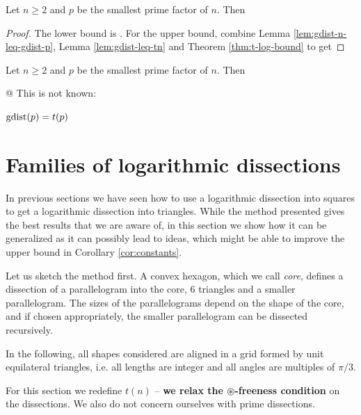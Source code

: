 
\begin{cor}
\label{cor:conj-proof}
Let $n \geq 2$ and $p$ be the smallest prime factor of $n$. Then
\end{cor}%
\begin{proof}
The lower bound is . For the upper bound, combine Lemma \ref{lem:gdist-n-leq-gdist-p}, Lemma \ref{lem:gdist-leq-tn} and Theorem \ref{thm:t-log-bound} to get
\end{proof}

\begin{cor}
\label{cor:constants}
Let $n \geq 2$ and $p$ be the smallest prime factor of $n$. Then
\end{cor}%

@ This is not known:

\begin{conj}
\label{conj:gdistp-equals-tp}
$\mathop{\mathrm{gdist}}(p) = t(p)$
\end{conj}%


\section{Families of logarithmic dissections}

In previous sections we have seen how to use a logarithmic dissection into squares to get a logarithmic dissection into triangles. While the method presented gives the best results that we are aware of, in this section we show how it can be generalized as it can possibly lead to ideas, which might be able to improve the upper bound in Corollary \ref{cor:constants}.

Let us sketch the method first. A convex hexagon, which we call \emph{core}, defines a dissection of a parallelogram into the core, 6 triangles and a smaller parallelogram. The sizes of the parallelograms depend on the shape of the core, and if chosen appropriately, the smaller parallelogram can be dissected recursively.

In the following, all shapes considered are aligned in a grid formed by unit equilateral triangles, i.e. all lengths are integer and all angles are multiples of $\pi/3$.

For this section we redefine $t(n)$ -- \textbf{we relax the $\circledast$-freeness condition} on the dissections. We also do not concern ourselves with prime dissections.

